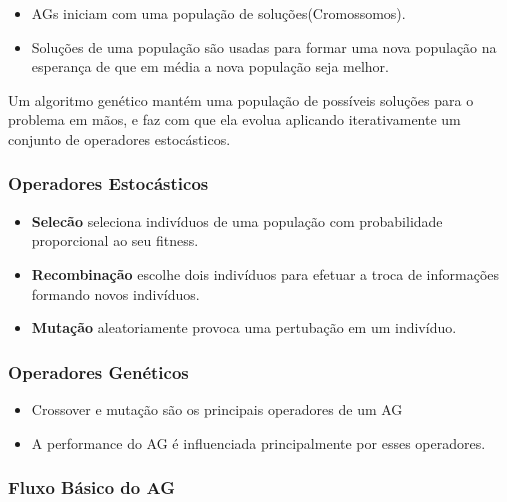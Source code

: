 \documentclass[12pt]{article}
\providecommand{\tightlist}{%
\setlength{\itemsep}{0pt}\setlength{\parskip}{0pt}}
\begin{document}
\begin{itemize}
\tightlist
\item
  AGs iniciam com uma população de soluções(Cromossomos).
\item
  Soluções de uma população são usadas para formar uma nova população na
  esperança de que em média a nova população seja melhor.
\end{itemize}

Um algoritmo genético mantém uma população de possíveis soluções para o
problema em mãos, e faz com que ela evolua aplicando iterativamente um
conjunto de operadores estocásticos.

\hypertarget{operadores-estocuxe1sticos}{%
\subsubsection{Operadores
Estocásticos}\label{operadores-estocuxe1sticos}}

\begin{itemize}
\tightlist
\item
  \textbf{Selecão} seleciona indivíduos de uma população com
  probabilidade proporcional ao seu fitness.
\item
  \textbf{Recombinação} escolhe dois indivíduos para efetuar a troca de
  informações formando novos indivíduos.
\item
  \textbf{Mutação} aleatoriamente provoca uma pertubação em um
  indivíduo.
\end{itemize}

\hypertarget{operadores-genuxe9ticos}{%
\subsubsection{Operadores Genéticos}\label{operadores-genuxe9ticos}}

\begin{itemize}
\tightlist
\item
  Crossover e mutação são os principais operadores de um AG
\item
  A performance do AG é influenciada principalmente por esses
  operadores.
\end{itemize}

\hypertarget{fluxo-buxe1sico-do-ag}{%
\subsubsection{Fluxo Básico do AG}\label{fluxo-buxe1sico-do-ag}}
\end{document}
